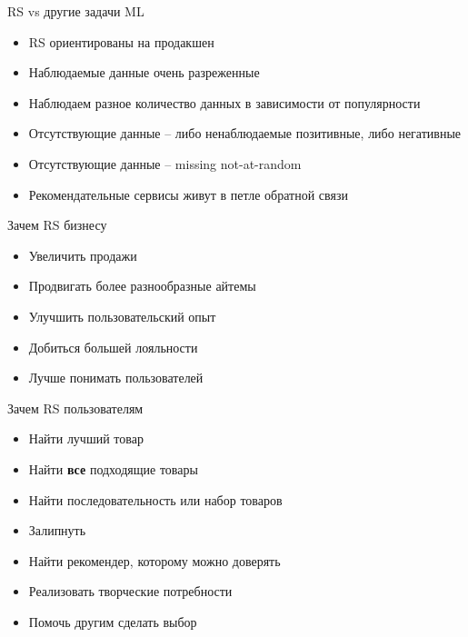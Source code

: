 \documentclass[11pt,aspectratio=169]{beamer}
\begin{document}
\begin{frame}{RS vs другие задачи ML \cite{NETFLIX}}

\begin{itemize}[<+->]
\item RS ориентированы на продакшен
\item Наблюдаемые данные очень разреженные
\item Наблюдаем разное количество данных в зависимости от популярности
\item Отсутствующие данные -- либо ненаблюдаемые позитивные, либо негативные
\item Отсутствующие данные -- missing not-at-random
\item Рекомендательные сервисы живут в петле обратной связи
\end{itemize}

\end{frame}

\begin{frame}{Зачем RS бизнесу}

\begin{itemize}[<+->]
\item Увеличить продажи
\item Продвигать более разнообразные айтемы
\item Улучшить пользовательский опыт
\item Добиться большей лояльности
\item Лучше понимать пользователей
\end{itemize}

\end{frame}

\begin{frame}{Зачем RS пользователям}

\begin{itemize}[<+->]
\item Найти лучший товар
\item Найти {\bf все} подходящие товары
\item Найти последовательность или набор товаров
\item Залипнуть
\item Найти рекомендер, которому можно доверять
\item Реализовать творческие потребности
\item Помочь другим сделать выбор
\end{itemize}

\end{frame}
\end{document}

